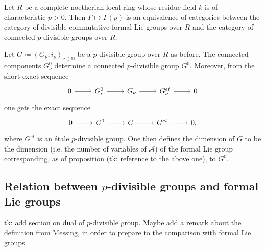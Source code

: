 \documentclass[../Main]{subfiles}
\begin{document}
\begin{prop}[]
	Let $R$ be a complete noetherian local ring whose residue field $k$
	is of characteristic $p > 0$.
	Then $\Gamma \mapsto \Gamma(p)$ is an equivalence of categories
	between the category of divisible commutative formal Lie groups over $R$
	and the category of connected $p$-divisible groups over $R$.
\end{prop}

\begin{defn}
	Let $G \coloneqq \left(G_{\nu}, i_\nu\right)_{\nu \in \mathbb{N}}$ be a $p$-divisible group
	over $R$ as before.
	The connected components $G^0_\nu$ determine a connected $p$-divisible
	group $G^0$.
	Moreover, from the short exact sequence
	\begin{equation*}
	\begin{tikzcd}
		0 \arrow[r, "", rightarrow] &
		G^0_\nu \arrow[r, "", rightarrow] &
		G_\nu \arrow[r, "", rightarrow] &
		G^{et}_\nu \arrow[r, "", rightarrow] &
		0
	\end{tikzcd}
	\end{equation*}
	one gets the exact sequence
	\begin{equation*}
	\begin{tikzcd}
		0 \arrow[r, "", rightarrow] &
		G^0 \arrow[r, "", rightarrow] &
		G \arrow[r, "", rightarrow] &
		G^{et} \arrow[r, "", rightarrow] &
		0
	,\end{tikzcd}
	\end{equation*}
	where $G^{et}$ is an étale $p$-divisible group.
	One then defines the dimension of $G$ to be the dimension 
	(i.e. the number of variables of $\mathscr{A}$)
	of the formal Lie group corresponding, as of proposition (tk: reference to the above one),
	to $G^0$.
\end{defn}

\subsection{Relation between \texorpdfstring{$p$}{p}-divisible groups and
formal Lie groups}


tk: add section on dual of $p$-divisible group. Maybe add a remark about
the definition from Messing, in order to prepare to
the comparison with formal Lie groups.
\end{document}
